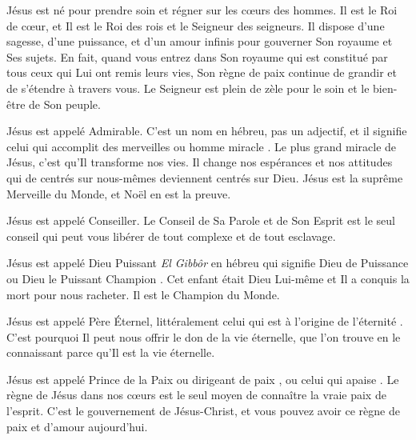 

Jésus est né pour prendre soin et régner sur les cœurs des hommes. Il est le Roi de cœur, et Il est le Roi des rois et le Seigneur des seigneurs. Il dispose d'une sagesse, d'une puissance, et d'un amour infinis pour gouverner Son royaume et Ses sujets. En fait, quand vous entrez dans Son royaume qui est constitué par tous ceux qui Lui ont remis leurs vies, Son règne de paix continue de grandir et de s'étendre à travers vous. Le Seigneur est plein de zèle pour le soin et le bien-être de Son peuple.

Jésus est appelé Admirable. C'est un nom en hébreu, pas un adjectif, et il signifie \Og celui qui accomplit des merveilles \Fg{} ou \Og homme miracle \Fg{}. Le plus grand miracle de Jésus, c'est qu'Il transforme nos vies. Il change nos espérances et nos attitudes qui de centrés sur nous-mêmes deviennent centrés sur Dieu. Jésus est la suprême Merveille du Monde, et Noël en est la preuve.

Jésus est appelé Conseiller. Le Conseil de Sa Parole et de Son Esprit est le seul conseil qui peut vous libérer de tout complexe et de tout esclavage.

Jésus est appelé Dieu Puissant \ocadr \emph{El Gibbôr} en hébreu \fcadr{} qui signifie \Og Dieu de Puissance \Fg{} ou \Og Dieu le Puissant Champion \Fg{}. Cet enfant était Dieu Lui-même et Il a conquis la mort pour nous racheter. Il est le Champion du Monde.

Jésus est appelé Père Éternel, littéralement \Og celui qui est à l'origine de l'éternité \Fg{}. C'est pourquoi Il peut nous offrir le don de la vie éternelle, que l'on trouve en le connaissant parce qu'Il est la vie éternelle.

Jésus est appelé Prince de la Paix ou \Og dirigeant de paix \Fg{}, ou \Og celui qui apaise \Fg{}. Le règne de Jésus dans nos cœurs est le seul moyen de connaître la vraie paix de l'esprit. C'est le gouvernement de Jésus-Christ, et vous pouvez avoir ce règne de paix et d'amour aujourd'hui.

\begin{dvquotes}
\end{dvquotes}


